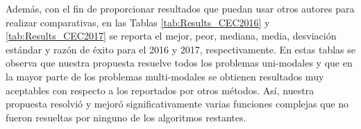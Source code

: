 Además, con el fin de proporcionar resultados que puedan usar otros autores para realizar comparativas, en las Tablas \ref{tab:Results_CEC2016} y \ref{tab:Results_CEC2017} 
se reporta el mejor, peor, mediana, media, desviación estándar y razón de éxito para el \CEC{} 2016 y 2017, respectivamente.
%
En estas tablas se observa que nuestra propuesta resuelve todos los problemas uni-modales y que en la mayor parte de los problemas multi-modales
se obtienen resultados muy aceptables con respecto a los reportados por otros métodos.
%
%
Así, nuestra propuesta resolvió y mejoró significativamente varias funciones complejas que no fueron resueltas por ninguno de los algoritmos restantes.
%

